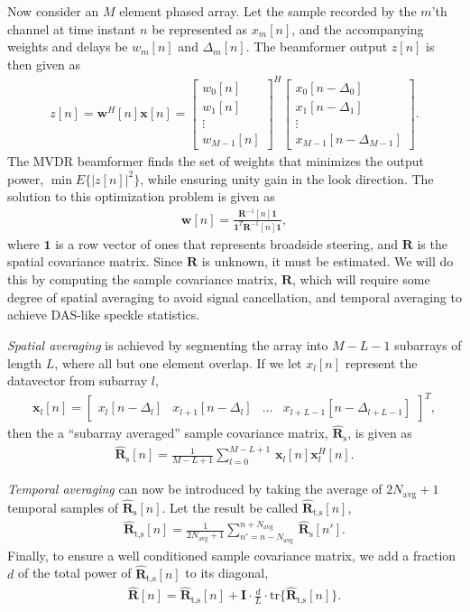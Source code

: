 \documentclass[10pt,a4paper]{article}
\newcommand\bmat[1]{\begin{bmatrix}#1\end{bmatrix}}
\newcommand\tr{\text{tr}}
\newcommand\sumb[2]{\sum\limits_{#1}^{#2}\,}
\newcommand\T{^{\scriptscriptstyle T}}
\renewcommand\H{^{\scriptscriptstyle H}}
\renewcommand\vec[1]{\boldsymbol{#1}}
\newcommand\mat[1]{\boldsymbol{#1}}
\newcommand\1{\vec 1}
\newcommand\I{\mat I}
\newcommand*\w{\vec w}
\newcommand*\x{\vec x}
\newcommand*\R{\mat R}
\newcommand*\Ri{\R^{-1}}
\newcommand*\eR{\mat{\hat R}}
\begin{document}
Now consider an $M$ element phased array. Let the sample recorded by the $m$'th channel at time instant $n$ be represented as $x_m[n]$, and the accompanying weights and delays be  $w_m[n]$ and $\Delta_m[n]$. The beamformer output $z[n]$ is then given as
\begin{align}
z[n] = \w\H[n]\x[n] = \bmat{w_0[n]\\w_1[n]\\\vdots\\w_{M-1}[n]}^H \bmat{x_0[n-\Delta_0]\\x_1[n-\Delta_1]\\\vdots\\x_{M-1}[n-\Delta_{M-1}]}.\label{z}
\end{align}
The \gls{MVDR} beamformer \cite{Capon1969} finds the set of weights that minimizes the output power, $\min E\{|z[n]|^2\}$, while ensuring unity gain in the look direction. The solution to this optimization problem is given as
\begin{gather}
\vec w[n] = \frac{\Ri[n]\1}{\1\T\Ri[n]\1},\label{weights}
\end{gather}
where $\1$ is a row vector of ones that represents broadside steering, and $\R$ is the spatial covariance matrix. Since $\R$ is unknown, it must be estimated. We will do this by computing the sample covariance matrix, $\eR$, which will require some degree of spatial averaging to avoid signal cancellation, and temporal averaging to achieve \gls{DAS}-like speckle statistics.

\emph{Spatial averaging} is achieved by segmenting the array into $M-L-1$ subarrays of length $L$, where all but one element overlap. If we let $x_l[n]$ represent the datavector from subarray $l$,
\begin{gather}
\x_l[n] = \bmat{x_l[n-\Delta_l] & x_{l+1}[n-\Delta_l] & \dots & x_{l+L-1}[n-\Delta_{l+L-1}]}\T,
\end{gather}
then the a ``subarray averaged'' sample covariance matrix, $\eR_\text{s}$, is given as
\begin{gather}
\eR_\text{s}[n] = \frac{1}{M-L+1} \sumb{l=0}{M-L+1} \x_l[n]\x_l\H[n].\label{spatialR}
\end{gather}

\emph{Temporal averaging} can now be introduced by taking the average of $2N_\text{avg}+1$ temporal samples of $\eR_\text{s}[n]$. Let the result be called $\eR_\text{t,s}[n]$,
\begin{gather}
\eR_\text{t,s}[n] = \frac{1}{2N_\text{avg}+1} \sumb{n'=n-N_\text{avg}}{n+N_\text{avg}} \eR_\text{s}[n'].
\end{gather}
Finally, to ensure a well conditioned sample covariance matrix, we add a fraction $d$ of the total power of $\eR_\text{t,s}[n]$ to its diagonal\cite{Synnevag2007},
\begin{align}
\eR[n] = \eR_\text{t,s}[n] + \I \cdot \frac{d}{L} \cdot \tr\{\eR_\text{t,s}[n]\}.\label{finalR}
\end{align}
\end{document}
